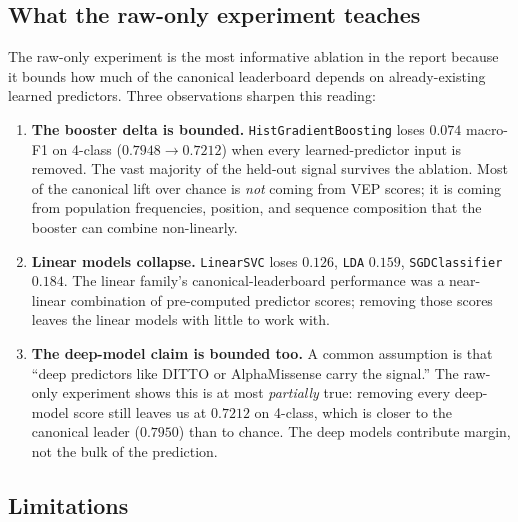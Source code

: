 \documentclass[11pt,a4paper]{article}
\begin{document}
\subsection{What the raw-only experiment teaches}

The raw-only experiment is the most informative ablation in the report
because it bounds how much of the canonical leaderboard depends on
already-existing learned predictors. Three observations sharpen this
reading:
\begin{enumerate}[leftmargin=*]
 \item \textbf{The booster delta is bounded.}
 \texttt{HistGradientBoosting} loses $0.074$ macro-F1 on 4-class
 ($0.7948 \to 0.7212$) when every learned-predictor input is
 removed. The vast majority of the held-out signal survives the
 ablation. Most of the canonical lift over chance is \emph{not}
 coming from VEP scores; it is coming from population frequencies,
 position, and sequence composition that the booster can combine
 non-linearly.
 \item \textbf{Linear models collapse.} \texttt{LinearSVC} loses $0.126$,
 \texttt{LDA} $0.159$, \texttt{SGDClassifier} $0.184$. The linear
 family's canonical-leaderboard performance was a near-linear
 combination of pre-computed predictor scores; removing those
 scores leaves the linear models with little to work with.
 \item \textbf{The deep-model claim is bounded too.} A common assumption
 is that ``deep predictors like DITTO or AlphaMissense carry the
 signal.'' The raw-only experiment shows this is at most
 \emph{partially} true: removing every deep-model score still
 leaves us at $0.7212$ on 4-class, which is closer to the canonical
 leader ($0.7950$) than to chance. The deep models contribute
 margin, not the bulk of the prediction.
\end{enumerate}

\subsection{Limitations}
\end{document}
